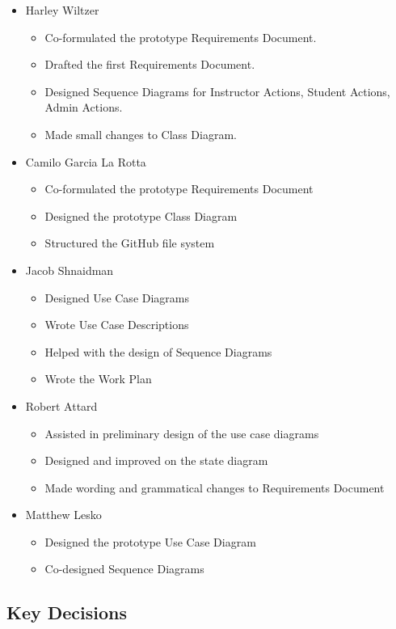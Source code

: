 \documentclass[12pt]{article}
\begin{document}
\begin{itemize}
    \item Harley Wiltzer
	\begin{itemize}
		\item Co-formulated the prototype Requirements Document.
		\item Drafted the first Requirements Document.
		\item Designed Sequence Diagrams for Instructor Actions, Student Actions, Admin Actions.
		\item Made small changes to Class Diagram.
	\end{itemize}
    \item Camilo Garcia La Rotta
    \begin{itemize}
        \item Co-formulated the prototype Requirements Document
        \item Designed the prototype Class Diagram
        \item Structured the GitHub file system
    \end{itemize}
    \item Jacob Shnaidman
		\begin{itemize}
			\item Designed Use Case Diagrams
			\item Wrote Use Case Descriptions
			\item Helped with the design of Sequence Diagrams
			\item Wrote the Work Plan
		\end{itemize}
    \item Robert Attard
    \begin{itemize}
        \item Assisted in preliminary design of the use case diagrams
        \item Designed and improved on the state diagram
        \item Made wording and grammatical changes to Requirements Document
    \end{itemize}
    \item Matthew Lesko
    \begin{itemize}
    	\item Designed the prototype Use Case Diagram
    	\item Co-designed Sequence Diagrams
    \end{itemize}
\end{itemize}

\subsection{Key Decisions}
\end{document}
